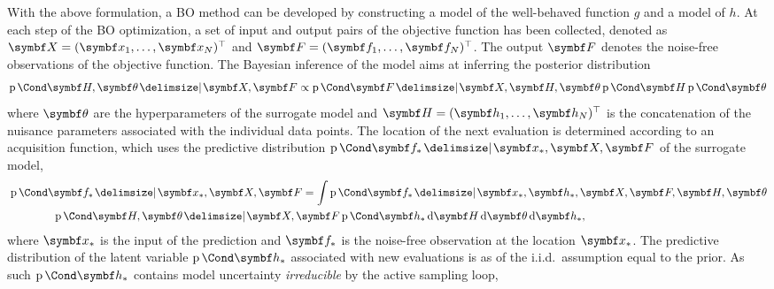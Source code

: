 With the above formulation, a BO method can be developed by constructing a model of the well-behaved function $g$
and a model of $h$.
At each step of the BO optimization, a set of input and output pairs of the objective function has been collected, denoted as $\mat{X} = (\mat{x}_1, \ldots, \mat{x}_N)^\top$ and $\mat{F} = (\mat{f}_1, \ldots, \mat{f}_N)^\top$.
The output $\mat{F}$ denotes the noise-free observations of the objective function.
The Bayesian inference of the model aims at inferring the posterior distribution
\begin{equation}
    \Prob{ \mat{H}, \mat{\theta} \given \mat{X}, \mat{F}}  \propto \Prob{\mat{F} \given \mat{X}, \mat{H}, \mat{\theta} }\Prob{\mat{H}}  \Prob{\mat{\theta}}
\end{equation}
where $\mat{\theta}$ are the hyperparameters of the surrogate model and $\mat{H} = (\mat{h}_1, \ldots, \mat{h}_N)^\top$ is the concatenation of the nuisance parameters associated with the individual data points.
The location of the next evaluation is determined according to an acquisition function,
which uses the predictive distribution $\Prob{\mat{f}_* \given \mat{x}_*,  \mat{X}, \mat{F}}$ of the surrogate model,
\begin{align}
    \label{eq:pred_dist}
    \begin{split}
        \MoveEqLeft\Prob{\mat{f}_* \given \mat{x}_*,  \mat{X}, \mat{F}} =
        \int \Prob{\mat{f}_* \given \mat{x}_*, \mat{h}_*, \mat{X}, \mat{F},\mat{H}, \mat{\theta}}\\
        &\qquad\Prob{\mat{H}, \mat{\theta} \given \mat{X}, \mat{F}} \Prob{\mat{h}_*} \diff{\mat{H}}\diff{\mat{\theta}}\diff{\mat{h}_*},
    \end{split}
\end{align}
where $\mat{x}_*$ is the input of the prediction and $\mat{f}_*$ is the noise-free observation at the location $\mat{x}_*$.
The predictive distribution of the latent variable $\Prob{\mat{h}_*}$ associated with new evaluations is as of the i.i.d.~assumption
equal to the prior.
As such $\Prob{\mat{h}_*}$ contains model uncertainty \emph{irreducible} by the active sampling loop,



